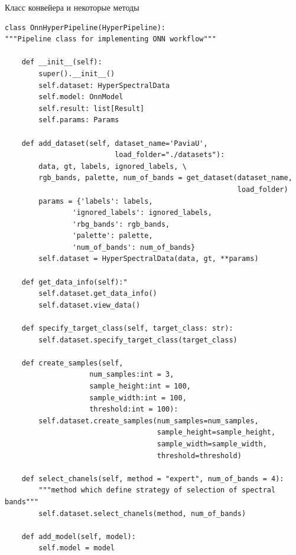 \documentclass[14pt, russian]{scrartcl}
\begin{document}
\begin{listing}[htt!]
    \caption{Класс конвейера и некоторые методы}
    \label{lst:pipeline}
    \begin{verbatim}
class OnnHyperPipeline(HyperPipeline):
"""Pipeline class for implementing ONN workflow"""

    def __init__(self):
        super().__init__()
        self.dataset: HyperSpectralData
        self.model: OnnModel
        self.result: list[Result]
        self.params: Params

    def add_dataset(self, dataset_name='PaviaU', 
                          load_folder="./datasets"):
        data, gt, labels, ignored_labels, \
        rgb_bands, palette, num_of_bands = get_dataset(dataset_name,
                                                       load_folder)
        params = {'labels': labels, 
                'ignored_labels': ignored_labels,
                'rbg_bands': rgb_bands,
                'palette': palette,
                'num_of_bands': num_of_bands}
        self.dataset = HyperSpectralData(data, gt, **params)

    def get_data_info(self):"
        self.dataset.get_data_info()
        self.dataset.view_data()
    
    def specify_target_class(self, target_class: str):
        self.dataset.specify_target_class(target_class)

    def create_samples(self, 
                    num_samples:int = 3,
                    sample_height:int = 100,
                    sample_width:int = 100,
                    threshold:int = 100):
        self.dataset.create_samples(num_samples=num_samples, 
                                    sample_height=sample_height,
                                    sample_width=sample_width,
                                    threshold=threshold)

    def select_chanels(self, method = "expert", num_of_bands = 4):
        """method which define strategy of selection of spectral bands"""
        self.dataset.select_chanels(method, num_of_bands)

    def add_model(self, model):
        self.model = model

    \end{verbatim}
\end{listing}
\end{document}
